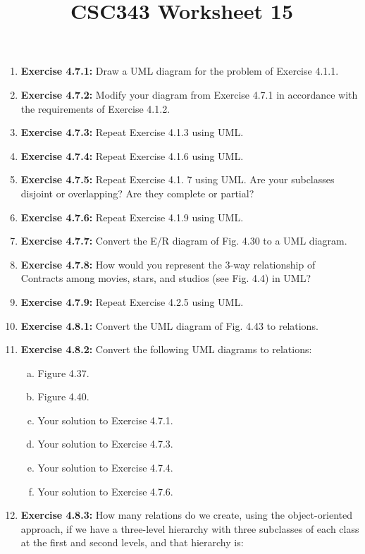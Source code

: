 \documentclass[12pt]{article}
\begin{document}
\title{CSC343 Worksheet 15}
\maketitle

\begin{enumerate}[1.]
    \item \textbf{Exercise 4.7.1:} Draw a UML diagram for the problem of Exercise 4.1.1.
    \item \textbf{Exercise 4.7.2:} Modify your diagram from Exercise 4.7.1 in accordance with the requirements of Exercise 4.1.2.
    \item \textbf{Exercise 4.7.3:} Repeat Exercise 4.1.3 using UML.
    \item \textbf{Exercise 4.7.4:} Repeat Exercise 4.1.6 using UML.
    \item \textbf{Exercise 4.7.5:} Repeat Exercise 4.1. 7 using UML. Are your subclasses disjoint or overlapping? Are they complete or partial?
    \item \textbf{Exercise 4.7.6:} Repeat Exercise 4.1.9 using UML.
    \item \textbf{Exercise 4.7.7:} Convert the E/R diagram of Fig. 4.30 to a UML diagram.
    \item \textbf{Exercise 4.7.8:} How would you represent the 3-way relationship of Contracts among movies, stars, and studios (see Fig. 4.4) in UML?
    \item \textbf{Exercise 4.7.9:} Repeat Exercise 4.2.5 using UML.
    \item \textbf{Exercise 4.8.1:} Convert the UML diagram of Fig. 4.43 to relations.
    \item \textbf{Exercise 4.8.2:} Convert the following UML diagrams to relations:

    \begin{enumerate}[a)]
        \item Figure 4.37.
        \item Figure 4.40.
        \item Your solution to Exercise 4.7.1.
        \item Your solution to Exercise 4.7.3.
        \item Your solution to Exercise 4.7.4.
        \item Your solution to Exercise 4.7.6.
    \end{enumerate}

    \item \textbf{Exercise 4.8.3:} How many relations do we create, using the object-oriented
    approach, if we have a three-level hierarchy with three subclasses of each class
    at the first and second levels, and that hierarchy is:


\end{enumerate}
\end{document}

